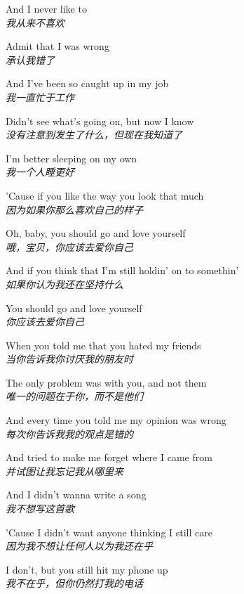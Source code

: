 \begin{spacing}{1.5}
\begin{flushleft}
And I never like to\\
\textit{我从来不喜欢}\lyricspace

Admit that I was wrong\\
\textit{承认我错了}\lyricspace

And I've been so caught up in my job\\
\textit{我一直忙于工作}\lyricspace

Didn't see what's going on, but now I know\\
\textit{没有注意到发生了什么，但现在我知道了}\lyricspace

I'm better sleeping on my own\\
\textit{我一个人睡更好}\lyricspace

'Cause if you like the way you look that much\\
\textit{因为如果你那么喜欢自己的样子}\lyricspace

Oh, baby, you should go and love yourself\\
\textit{哦，宝贝，你应该去爱你自己}\lyricspace

And if you think that I'm still holdin' on to somethin'\\
\textit{如果你认为我还在坚持什么}\lyricspace

You should go and love yourself\\
\textit{你应该去爱你自己}\lyricspace

When you told me that you hated my friends\\
\textit{当你告诉我你讨厌我的朋友时}\lyricspace

The only problem was with you, and not them\\
\textit{唯一的问题在于你，而不是他们}\lyricspace

And every time you told me my opinion was wrong\\
\textit{每次你告诉我我的观点是错的}\lyricspace

And tried to make me forget where I came from\\
\textit{并试图让我忘记我从哪里来}\lyricspace

And I didn't wanna write a song\\
\textit{我不想写这首歌}\lyricspace

'Cause I didn't want anyone thinking I still care\\
\textit{因为我不想让任何人以为我还在乎}\lyricspace

I don't, but you still hit my phone up\\
\textit{我不在乎，但你仍然打我的电话}\lyricspace


\end{flushleft}
\end{spacing}
